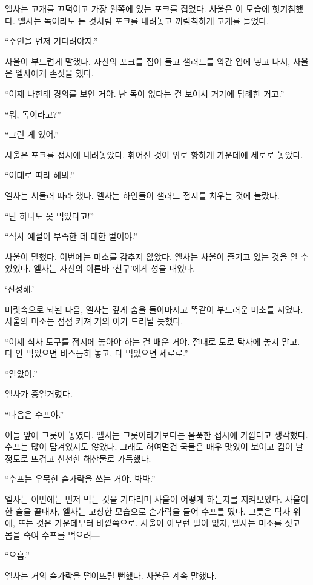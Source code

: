 엘사는 고개를 끄덕이고 가장 왼쪽에 있는 포크를 집었다. 사울은 이 모습에 헛기침했다. 엘사는 독이라도 든 것처럼 포크를 내려놓고 꺼림칙하게 고개를 들었다.

``주인을 먼저 기다려야지.''

사울이 부드럽게 말했다. 자신의 포크를 집어 들고 샐러드를 약간 입에 넣고 나서, 사울은 엘사에게 손짓을 했다.

``이제 나한테 경의를 보인 거야. 난 독이 없다는 걸 보여서 거기에 답례한 거고.''

``뭐, 독이라고?''

``그런 게 있어.''

사울은 포크를 접시에 내려놓았다. 휘어진 것이 위로 향하게 가운데에 세로로 놓았다.

``이대로 따라 해봐.''

엘사는 서둘러 따라 했다. 엘사는 하인들이 샐러드 접시를 치우는 것에 놀랐다.

``난 하나도 못 먹었다고!''

``식사 예절이 부족한 데 대한 벌이야.''

사울이 말했다. 이번에는 미소를 감추지 않았다. 엘사는 사울이 즐기고 있는 것을 알 수 있었다. 엘사는 자신의 이른바 `친구'에게 성을 내었다.

`진정해.'

머릿속으로 되뇐 다음, 엘사는 깊게 숨을 들이마시고 똑같이 부드러운 미소를 지었다. 사울의 미소는 점점 커져 거의 이가 드러날 듯했다.

``이제 식사 도구를 접시에 놓아야 하는 걸 배운 거야. 절대로 도로 탁자에 놓지 말고. 다 안 먹었으면 비스듬히 놓고, 다 먹었으면 세로로.''

``알았어.''

엘사가 중얼거렸다.

``다음은 수프야.''

이들 앞에 그릇이 놓였다. 엘사는 그릇이라기보다는 움푹한 접시에 가깝다고 생각했다. 수프는 많이 담겨있지도 않았다. 그래도 허여멀건 국물은 매우 맛있어 보이고 김이 날 정도로 뜨겁고 신선한 해산물로 가득했다.

``수프는 우묵한 숟가락을 쓰는 거야. 봐봐.''

엘사는 이번에는 먼저 먹는 것을 기다리며 사울이 어떻게 하는지를 지켜보았다. 사울이 한 술을 끝내자, 엘사는 고상한 모습으로 숟가락을 들어 수프를 떴다. 그릇은 탁자 위에, 뜨는 것은 가운데부터 바깥쪽으로. 사울이 아무런 말이 없자, 엘사는 미소를 짓고 몸을 숙여 수프를 먹으려—

``으흠.''

엘사는 거의 숟가락을 떨어뜨릴 뻔했다. 사울은 계속 말했다.

